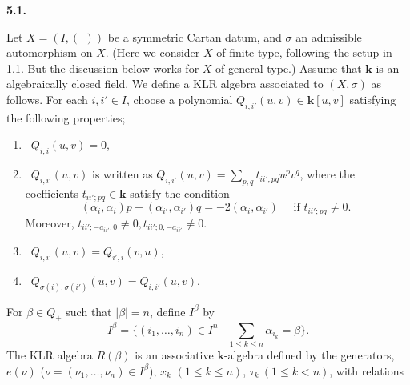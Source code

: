 \documentclass[12pt]{amsart}
\renewcommand\a{\alpha}
\renewcommand\b{\beta}
\newcommand\s{\sigma}
\renewcommand{\1}{\mathbb 1}
\newcommand\Bk{\mathbf k}
\numberwithin{equation}{section}
\def \para#1{\par\medskip\textbf{#1}
              \addtocounter{thm}{1}}
\begin{document}
\para{5.1.}
Let $X = (I, (\,\ ))$ be a symmetric Cartan datum, and $\s$ an admissible automorphism on $X$. 
(Here we consider $X$ of finite type, following the setup in 1.1.  But the discussion
below works for $X$ of general type.)
Assume that $\Bk$ is an algebraically closed field.  We define 
a KLR algebra associated to $(X, \s)$ as follows. For each $i, i' \in I$, 
choose  a polynomial $Q_{i,i'}(u,v) \in \Bk[u,v]$ 
satisfying the following properties;
\begin{enumerate}
\item \ $Q_{i,i}(u,v) = 0$,  
\item  \ $Q_{i,i'}(u,v)$ is written as 
$Q_{i,i'}(u,v) = \sum_{p,q}t_{ii';pq}u^pv^q$, where the 
coefficients $t_{ii';pq} \in \Bk$ satisfy the condition 
\begin{equation*}
(\a_i,\a_i)p + (\a_{i'},\a_{i'})q = -2(\a_i,\a_{i'}) 
        \quad\text{ if $t_{ii';pq} \ne 0$. }
\end{equation*}
Moreover, $t_{ii';-a_{ii'},0} \ne 0, t_{ii';0,-a_{ii'}} \ne 0$.  
\item  \ $Q_{i,i'}(u,v) = Q_{i',i}(v,u)$, 
\item \ $Q_{\s(i),\s(i')}(u,v) = Q_{i,i'}(u,v)$.  
\end{enumerate}
\par
For $\b \in Q_+$  such that $|\b| = n$, define $I^{\b}$ by 
\begin{equation*}
I^{\b} = \{ (i_1, \dots, i_n) \in I^n \mid \sum_{1 \le k \le n}\a_{i_k} = \b\}.
\end{equation*}
The KLR algebra $R(\b)$ is an associative $\Bk$-algebra 
defined by the generators, $e(\nu)$ ($\nu = (\nu_1, \dots, \nu_n) \in I^{\b}$), 
$x_k$ $(1 \le k \le n)$, $\tau_k \ (1 \le k < n)$,  with relations
\end{document}
